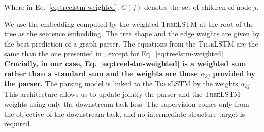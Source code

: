 Where in Eq.~\ref{eq:treelstm-weighted}, $C(j)$ denotes the set of children of node $j$.


We use the embedding computed by the weighted \textsc{TreeLSTM} at the root of the tree as the sentence embedding.
The tree shape and the edge weights are given by the best prediction of a graph parser. The equations from the \textsc{TreeLSTM} are the same than the one presented in , except for Eq.~\ref{eq:treelstm-weighted}. \textbf{Crucially, in our case, Eq.~\ref{eq:treelstm-weighted} is a \underline{weighted} sum rather than a standard sum and the weights are those $\alpha_{kj}$ provided by the parser.} The parsing model is linked to the \textsc{TreeLSTM} by the weights $\alpha_{kj}$. This architecture allows us to update jointly the parser and the \textsc{TreeLSTM} weights using only the downstream task loss. The supervision comes only from the objective of the downstream task, and no intermediate structure target is required.

